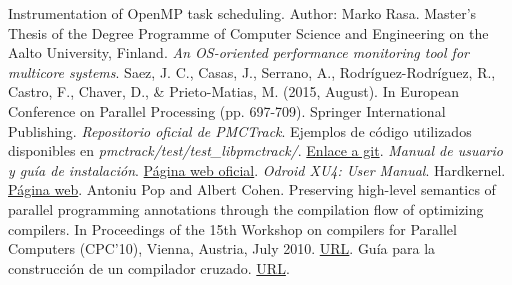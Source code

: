 \begin{thebibliography}{1}
 Instrumentation of OpenMP task scheduling. Author: Marko Rasa. Master's Thesis of the Degree Programme of Computer Science and Engineering on the Aalto University, Finland.
\textit{An OS-oriented performance monitoring tool for multicore systems}. Saez, J. C., Casas, J., Serrano, A., Rodríguez-Rodríguez, R., Castro, F., Chaver, D., \& Prieto-Matias, M. (2015, August). In European Conference on Parallel Processing (pp. 697-709). Springer International Publishing.
 \textit{Repositorio oficial de PMCTrack}. Ejemplos de código utilizados disponibles en \textit{pmctrack/test/test\_libpmctrack/}. \href{https://github.com/jcsaezal/pmctrack}{Enlace a git}.
 \textit{Manual de usuario y guía de instalación}. \href{https://pmctrack.dacya.ucm.es/getting-started/}{Página web oficial}.
 \textit{Odroid XU4: User Manual}. Hardkernel. \href{http://magazine.odroid.com/odroid-xu4/}{Página web}.
Antoniu Pop and Albert Cohen. Preserving high-level semantics of parallel programming annotations through the compilation flow of optimizing compilers. In Proceedings of the 15th Workshop on compilers for Parallel Computers (CPC’10), Vienna, Austria, July 2010. \href{https://hal.inria.fr/inria-00551518}{URL}.
Guía para la construcción de un compilador cruzado. \href{http://preshing.com/20141119/how-to-build-a-gcc-cross-compiler/}{URL}.

\end{thebibliography}

